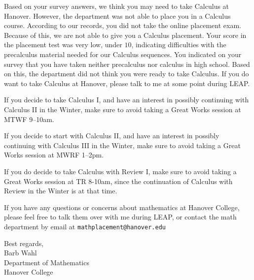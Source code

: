 \documentclass[12pt]{article}
\begin{document}
      Based on your survey answers, we think you may need to take Calculus at Hanover. However, the department was not able to place you in a Calculus course.
        According to our records, you did not take the online placement exam. Because of this, we are not able to give you a Calculus placement.
      	Your score in the placement test was very low, under \( 10 \), indicating difficulties with the precalculus material needed for our Calculus sequences.
          You indicated on your survey that you have taken neither precalculus nor calculus in high school.
	      Based on this, the department did not think you were ready to take Calculus. 
      If you do want to take Calculus at Hanover, please talk to me at some point during LEAP.



    If you decide to take Calculus I, and have an interest in possibly continuing with Calculus II in the Winter, make sure to avoid taking a Great Works session at MTWF 9--10am.
    
    If you decide to start with Calculus II, and have an interest in possibly continuing with Calculus III in the Winter, make sure to avoid taking a Great Works session at MWRF 1--2pm.
    
    If you do decide to take Calculus with Review I, make sure to avoid taking a Great Works session at TR 8-10am, since the continuation of Calculus with Review in the Winter is at that time.

		If you have any questions or concerns about mathematics at Hanover College, please feel free to talk them over with me during LEAP, or contact the math department by email at \texttt{mathplacement@hanover.edu}
		\vspace{0.4in}

		\noindent Best regards,\\
		Barb Wahl\\
		Department of Mathematics\\
		Hanover College
\end{document}
